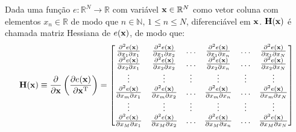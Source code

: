 \begin{proposition}\label{def:hessian}
 Dada uma função $e:\mathbb{R}^{N}\rightarrow \mathbb{R}$ com variável $\VECTOR{x} \in \mathbb{R}^{N}$
 como vetor coluna  com elementos $x_n\in \mathbb{R}$ de modo que $n\in \mathbb{N}$, $1 \leq n \leq N$,
 diferenciável em $\VECTOR{x}$. 
 $\MATRIX{H}(\VECTOR{x})$ é chamada matriz Hessiana \cite{Hessian} \FALTAREFERENCIA   de $e(\VECTOR{x})$, de modo que: 
 \begin{equation}
  \MATRIX{H}(\VECTOR{x})\equiv \frac{\partial }{\partial \VECTOR{x}} \left( \frac{\partial e(\VECTOR{x})}{ \partial \VECTOR{x}^{\transpose} }\right)=
\left[
\begin{matrix}
\frac{\partial^2 e(\VECTOR{x}) }{\partial x_{1}\partial x_{1}}&
\frac{\partial^2 e(\VECTOR{x}) }{\partial x_{1}\partial x_{2}}&
\hdots&
\frac{\partial^2 e(\VECTOR{x}) }{\partial x_{1}\partial x_{n}}&
\hdots&
\frac{\partial^2 e(\VECTOR{x}) }{\partial x_{1}\partial x_{N}}\\
\frac{\partial^2 e(\VECTOR{x}) }{\partial x_{2}\partial x_{1}}&
\frac{\partial^2 e(\VECTOR{x}) }{\partial x_{2}\partial x_{2}}&
\hdots&
\frac{\partial^2 e(\VECTOR{x}) }{\partial x_{2}\partial x_{n}}&
\hdots&
\frac{\partial^2 e(\VECTOR{x}) }{\partial x_{2}\partial x_{N}}\\
\vdots&
\vdots&
\vdots&
\vdots&
\vdots&
\vdots\\
\frac{\partial^2 e(\VECTOR{x}) }{\partial x_{m}\partial x_{1}}&
\frac{\partial^2 e(\VECTOR{x}) }{\partial x_{m}\partial x_{2}}&
\hdots&
\frac{\partial^2 e(\VECTOR{x}) }{\partial x_{m}\partial x_{n}}&
\hdots&
\frac{\partial^2 e(\VECTOR{x}) }{\partial x_{m}\partial x_{N}}\\
\vdots&
\vdots&
\vdots&
\vdots&
\vdots&
\vdots\\
\frac{\partial^2 e(\VECTOR{x}) }{\partial x_{M}\partial x_{1}}&
\frac{\partial^2 e(\VECTOR{x}) }{\partial x_{M}\partial x_{2}}&
\hdots&
\frac{\partial^2 e(\VECTOR{x}) }{\partial x_{M}\partial x_{n}}&
\hdots&
\frac{\partial^2 e(\VECTOR{x}) }{\partial x_{M}\partial x_{N}}\\
\end{matrix}
\right]
 \end{equation}
\end{proposition}

